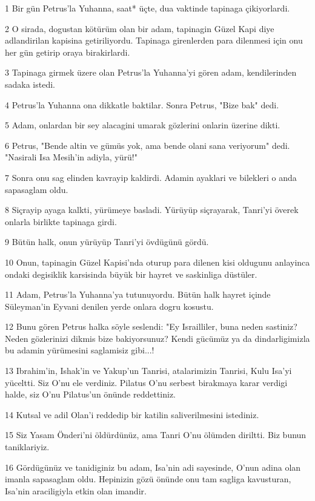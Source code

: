 \par 1 Bir gün Petrus'la Yuhanna, saat* üçte, dua vaktinde tapinaga çikiyorlardi.
\par 2 O sirada, dogustan kötürüm olan bir adam, tapinagin Güzel Kapi diye adlandirilan kapisina getiriliyordu. Tapinaga girenlerden para dilenmesi için onu her gün getirip oraya birakirlardi.
\par 3 Tapinaga girmek üzere olan Petrus'la Yuhanna'yi gören adam, kendilerinden sadaka istedi.
\par 4 Petrus'la Yuhanna ona dikkatle baktilar. Sonra Petrus, "Bize bak" dedi.
\par 5 Adam, onlardan bir sey alacagini umarak gözlerini onlarin üzerine dikti.
\par 6 Petrus, "Bende altin ve gümüs yok, ama bende olani sana veriyorum" dedi. "Nasirali Isa Mesih'in adiyla, yürü!"
\par 7 Sonra onu sag elinden kavrayip kaldirdi. Adamin ayaklari ve bilekleri o anda sapasaglam oldu.
\par 8 Siçrayip ayaga kalkti, yürümeye basladi. Yürüyüp siçrayarak, Tanri'yi överek onlarla birlikte tapinaga girdi.
\par 9 Bütün halk, onun yürüyüp Tanri'yi övdügünü gördü.
\par 10 Onun, tapinagin Güzel Kapisi'nda oturup para dilenen kisi oldugunu anlayinca ondaki degisiklik karsisinda büyük bir hayret ve saskinliga düstüler.
\par 11 Adam, Petrus'la Yuhanna'ya tutunuyordu. Bütün halk hayret içinde Süleyman'in Eyvani denilen yerde onlara dogru kosustu.
\par 12 Bunu gören Petrus halka söyle seslendi: "Ey Israilliler, buna neden sastiniz? Neden gözlerinizi dikmis bize bakiyorsunuz? Kendi gücümüz ya da dindarligimizla bu adamin yürümesini saglamisiz gibi...!
\par 13 Ibrahim'in, Ishak'in ve Yakup'un Tanrisi, atalarimizin Tanrisi, Kulu Isa'yi yüceltti. Siz O'nu ele verdiniz. Pilatus O'nu serbest birakmaya karar verdigi halde, siz O'nu Pilatus'un önünde reddettiniz.
\par 14 Kutsal ve adil Olan'i reddedip bir katilin saliverilmesini istediniz.
\par 15 Siz Yasam Önderi'ni öldürdünüz, ama Tanri O'nu ölümden diriltti. Biz bunun taniklariyiz.
\par 16 Gördügünüz ve tanidiginiz bu adam, Isa'nin adi sayesinde, O'nun adina olan imanla sapasaglam oldu. Hepinizin gözü önünde onu tam sagliga kavusturan, Isa'nin araciligiyla etkin olan imandir.
